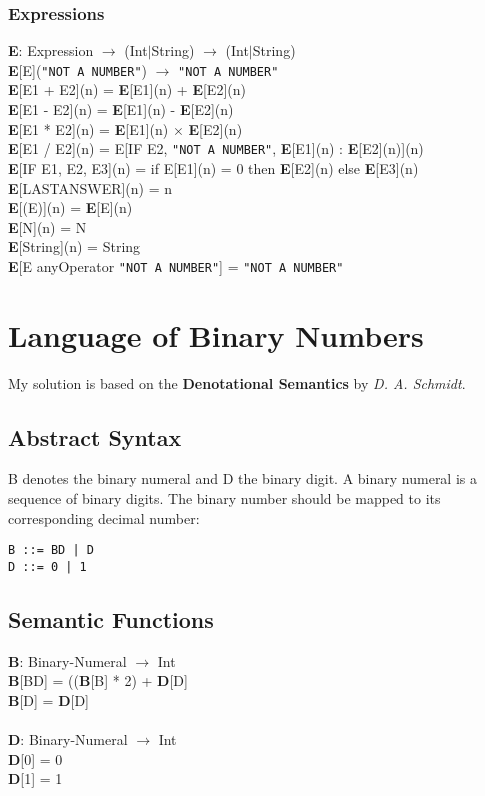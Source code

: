 \documentclass{report}
\begin{document}
			\subsubsection{Expressions}
			\startsubsection
				\textbf{E}: Expression $\rightarrow$ (Int$|$String) $\rightarrow$ (Int$|$String) \\
				\textbf{E}[E](\texttt{"NOT A NUMBER"}) $\rightarrow$ \texttt{"NOT A NUMBER"} \\
				\textbf{E}[E1 + E2](n) = \textbf{E}[E1](n) + \textbf{E}[E2](n) \\
				\textbf{E}[E1 - E2](n) = \textbf{E}[E1](n) - \textbf{E}[E2](n) \\
				\textbf{E}[E1 * E2](n) = \textbf{E}[E1](n) $\times$ \textbf{E}[E2](n) \\
				\textbf{E}[E1 / E2](n) = E[IF E2, \texttt{"NOT A NUMBER"}, \textbf{E}[E1](n) : \textbf{E}[E2](n)](n) \\
				\textbf{E}[IF E1, E2, E3](n) = if E[E1](n) = 0 then \textbf{E}[E2](n) else \textbf{E}[E3](n) \\
				\textbf{E}[LASTANSWER](n) = n \\
				\textbf{E}[(E)](n) = \textbf{E}[E](n)  \\
				\textbf{E}[N](n) = N \\
				\textbf{E}[String](n) = String \\
				\textbf{E}[E anyOperator \texttt{"NOT A NUMBER"}] = \texttt{"NOT A NUMBER"}
			\closesection
		\closesection
	\closesection
	\newpage
	\section{Language of Binary Numbers}
	\startsection
		My solution is based on the \textbf{Denotational Semantics} by \textit{D. A. Schmidt}.
		\subsection{Abstract Syntax}
		\startsubsection
			B denotes the binary numeral and D the binary digit. A binary numeral is a sequence of binary digits. The binary number should be mapped to its corresponding decimal number:
			\begin{verbatim}
B ::= BD | D
D ::= 0 | 1
			\end{verbatim}
		\closesection
		\subsection{Semantic Functions}
		\startsubsection
			\textbf{B}: Binary-Numeral $\rightarrow$ Int \\
			\textbf{B}[BD] = ((\textbf{B}[B] * 2) + \textbf{D}[D] \\
			\textbf{B}[D] = \textbf{D}[D] \\
			\\
			\textbf{D}: Binary-Numeral $\rightarrow$ Int \\
			\textbf{D}[0] = 0 \\
			\textbf{D}[1] = 1 \\
		\closesection
\end{document}
